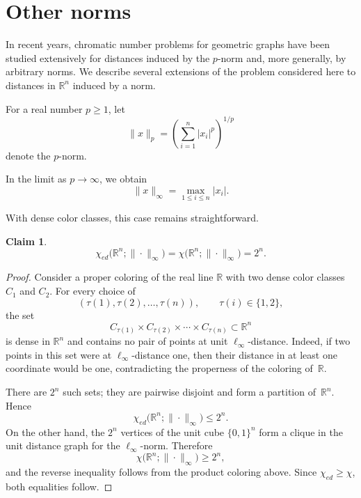 \documentclass[12pt,a4paper]{article}
\newtheorem{claim}{Claim}
\begin{document}

\section{Other norms}

In recent years, chromatic number problems for geometric graphs have been
studied extensively for distances induced by the $p$-norm and, more
generally, by arbitrary norms. We describe several extensions of the
problem considered here to distances in $\mathbb{R}^n$ induced by a norm.

For a real number $p\geq 1$, let
\[
    \|x\|_p=\left(\sum_{i=1}^n |x_i|^p\right)^{1/p}
\]
denote the $p$-norm.

In the limit as $p\to\infty$, we obtain
\[
    \|x\|_\infty=\max_{1\leq i\leq n}|x_i|.
\]

With dense color classes, this case remains straightforward.

\begin{claim}
    \[
    \chi_{ed}\bigl(\mathbb{R}^n;\|\cdot\|_\infty\bigr)
    =
    \chi\bigl(\mathbb{R}^n;\|\cdot\|_\infty\bigr)
    =
    2^n.
    \]
\end{claim}

\begin{proof}
Consider a proper coloring of the real line $\mathbb{R}$ with two
dense color classes $C_1$ and $C_2$. For every choice of
\[
(\tau(1),\tau(2),\dots,\tau(n)),\qquad \tau(i)\in\{1,2\},
\]
the set
\[
    C_{\tau(1)}\times C_{\tau(2)}\times\cdots\times C_{\tau(n)}
    \subset\mathbb{R}^n
\]
is dense in $\mathbb{R}^n$ and contains no pair of points at unit
$\ell_\infty$-distance. Indeed, if two points in this set were at
$\ell_\infty$-distance one, then their distance in at least one coordinate
would be one, contradicting the properness of the coloring of~$\mathbb{R}$.

There are $2^n$ such sets; they are pairwise disjoint and form a partition
of~$\mathbb{R}^n$. Hence
\[
\chi_{ed}\bigl(\mathbb{R}^n;\|\cdot\|_\infty\bigr)\leq 2^n.
\]
On the other hand, the $2^n$ vertices of the unit cube
$\{0,1\}^n$ form a clique in the unit distance graph for the
$\ell_\infty$-norm. Therefore
\[
\chi\bigl(\mathbb{R}^n;\|\cdot\|_\infty\bigr)\geq 2^n,
\]
and the reverse inequality follows from the product coloring above.
Since $\chi_{ed}\geq\chi$, both equalities follow.
\end{proof}
\end{document}
